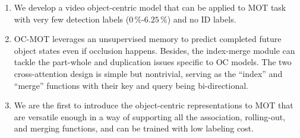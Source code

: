 \begin{enumerate}[label=(\arabic*)]
    \item We develop a video object-centric model that can be applied to MOT task with very few detection labels ($0\,\%$-$6.25\,\%$) and no ID labels.
    \item OC-MOT leverages an unsupervised memory to predict completed future object states even if occlusion happens. Besides, the index-merge module can tackle the part-whole and duplication issues specific to OC models. The two cross-attention design is simple but nontrivial, serving as the “index” and “merge” functions with their key and query being bi-directional.
    \item We are the first to introduce the object-centric representations to MOT that are versatile enough in a way of supporting all the association, rolling-out, and merging functions, and can be trained with low labeling cost.

\end{enumerate}




